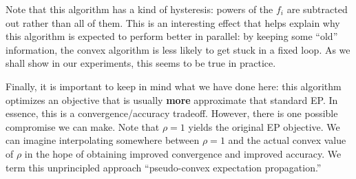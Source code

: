 \documentclass[times, 10pt,twocolumn]{article}
\begin{document}
Note that this algorithm has a kind of hysteresis: powers of the
$f_i$ are subtracted out rather than all of them. This is an
interesting effect that helps explain why this algorithm is
expected to perform better in parallel: by keeping some ``old''
information, the convex algorithm is less likely to get stuck
in a fixed loop. As we shall show in our experiments, this seems to
be true in practice.

Finally, it is important to keep in mind what we have done here:
this algorithm optimizes an objective that is usually \textbf{more}
approximate that standard EP. In essence, this is a
convergence/accuracy tradeoff. However, there is one possible
compromise we can make. Note that $\rho = 1$ yields the original
EP objective. We can imagine interpolating somewhere between $\rho
= 1$ and the actual convex value of $\rho$ in the hope of obtaining
improved convergence and improved accuracy. We term this
unprincipled approach ``pseudo-convex expectation propagation.''
\end{document}
